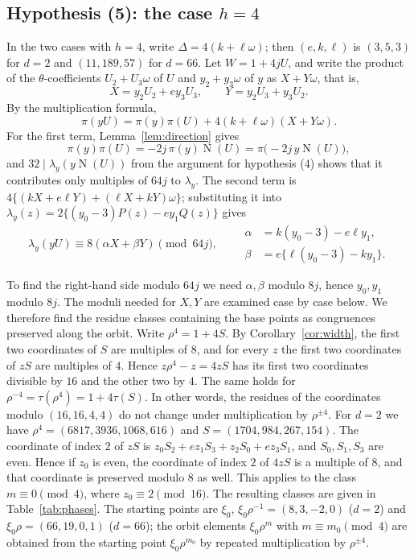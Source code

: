 \documentclass[a4paper,11pt]{article}
\theoremstyle{plain}
\theoremstyle{definition}
\theoremstyle{remark}
\numberwithin{equation}{section}
\numberwithin{table}{section}
\newcommand{\Nm}{\operatorname{N}}
\newcommand{\tsec}[2]{\texorpdfstring{#1}{#2}}
\begin{document}
\subsection{Hypothesis (5): the case \tsec{$h=4$}{h=4}}\label{sec:hyp5b}

In the two cases with $h=4$, write $\Delta=4(k+\ell\omega)$; then $(e,k,\ell)$ is $(3,5,3)$ for $d=2$ and $(11,189,57)$ for $d=66$.
Let $W=1+4jU$, and write the product of the $\theta$-coefficients $U_2+U_3\omega$ of $U$ and $y_2+y_3\omega$ of $y$ as $X+Y\omega$, that is,
\[
X=y_2U_2+ey_3U_3,\qquad Y=y_2U_3+y_3U_2.
\]
By the multiplication formula,
\[
\pi(yU)=\pi(y)\pi(U)+4(k+\ell\omega)(X+Y\omega).
\]
For the first term, Lemma~\ref{lem:direction} gives
\[
\pi(y)\pi(U)=-2j\,\pi(y)\Nm(U)=\pi\bigl(-2j\,y\Nm(U)\bigr),
\]
and $32\mid\lambda_y(y\Nm(U))$ from the argument for hypothesis (4) shows that it contributes only multiples of $64j$ to $\lambda_y$.
The second term is $4\{(kX+e\ell Y)+(\ell X+kY)\omega\}$; substituting it into $\lambda_y(z)=2\{(y_0-3)P(z)-ey_1Q(z)\}$ gives
\begin{equation}\label{eq:pairing}
\lambda_y(yU)\equiv8(\alpha X+\beta Y)\pmod{64j},\qquad
\begin{aligned}
\alpha&=k(y_0-3)-e\ell y_1,\\
\beta&=e\{\ell(y_0-3)-ky_1\}.
\end{aligned}
\end{equation}

To find the right-hand side modulo $64j$ we need $\alpha,\beta$ modulo $8j$, hence $y_0,y_1$ modulo $8j$. The moduli needed for $X,Y$ are examined case by case below.
We therefore find the residue classes containing the base points as congruences preserved along the orbit.
Write $\rho^4=1+4S$. By Corollary~\ref{cor:width}, the first two coordinates of $S$ are multiples of $8$, and for every $z$ the first two coordinates of $zS$ are multiples of $4$.
Hence $z\rho^4-z=4zS$ has its first two coordinates divisible by $16$ and the other two by $4$. The same holds for $\rho^{-4}=\tau(\rho^4)=1+4\tau(S)$.
In other words, the residues of the coordinates modulo $(16,16,4,4)$ do not change under multiplication by $\rho^{\pm4}$.
For $d=2$ we have $\rho^4=(6817,3936,1068,616)$ and $S=(1704,984,267,154)$. The coordinate of index $2$ of $zS$ is $z_0S_2+ez_1S_3+z_2S_0+ez_3S_1$, and $S_0,S_1,S_3$ are even. Hence if $z_0$ is even, the coordinate of index $2$ of $4zS$ is a multiple of $8$, and that coordinate is preserved modulo $8$ as well. This applies to the class $m\equiv0\pmod4$, where $z_0\equiv2\pmod{16}$.
The resulting classes are given in Table~\ref{tab:phases}. The starting points are $\xi_0$, $\xi_0\rho^{-1}=(8,3,-2,0)$ ($d=2$) and $\xi_0\rho=(66,19,0,1)$ ($d=66$); the orbit elements $\xi_0\rho^m$ with $m\equiv m_0\pmod4$ are obtained from the starting point $\xi_0\rho^{m_0}$ by repeated multiplication by $\rho^{\pm4}$.
\end{document}
